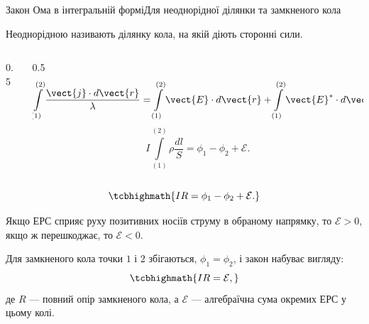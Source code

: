 \documentclass[onlytextwidth]{beamer}
\begin{document}
\begin{frame}{Закон Ома в інтегральній формі}{Для неоднорідної ділянки та замкненого кола}
	\begin{alertblock}{}\centering
		Неоднорідною називають ділянку кола, на якій діють сторонні сили.
	\end{alertblock}
	\begin{columns}
		\begin{column}{0.5\linewidth}\center
			
		\end{column}
		\begin{column}{0.5\linewidth}
			\begin{equation*}
				\int\limits_{(1)}^{(2)}\frac{\vect{j}\cdot d\vect{r}}{\lambda} = \int\limits_{(1)}^{(2)}\vect{E}\cdot d\vect{r} +
				\int\limits_{(1)}^{(2)}\vect{E}^*\cdot d\vect{r}.
			\end{equation*}
			\begin{equation*}
				I \int\limits_{(1)}^{(2)}\rho\frac{dl}{S} = \phi_1 - \phi_2 + \mathcal{E}.
			\end{equation*}
		\end{column}
	\end{columns}
	\begin{overprint}
		\begin{equation*}
			\tcbhighmath{I R = \phi_1 - \phi_2 + \mathcal{E}.}
		\end{equation*}
		\begin{alertblock}{}\justifying
			Якщо ЕРС сприяє руху позитивних носіїв струму в обраному напрямку, то $\mathcal{E} > 0$, якщо ж перешкоджає, то  $\mathcal{E} < 0$.
		\end{alertblock}
		\begin{block}{}
			Для замкненого кола точки $1$ і $2$ збігаються, $\phi_1 = \phi_2$, і закон набуває вигляду:
			\begin{equation*}
				\tcbhighmath{I R = \mathcal{E},}
			\end{equation*}
			де $R$ --- повний опір замкненого кола, а $\mathcal{E}$ --- алгебраїчна сума окремих ЕРС у цьому колі.
		\end{block}
	\end{overprint}
\end{frame}



\end{document}
